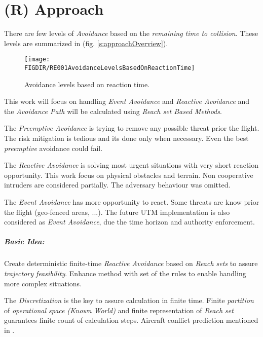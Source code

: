 \chapter{(R) Approach}\label{ch:approach}

\noindent There are few levels of \emph{Avoidance} based on the \emph{remaining time to collision}. These levels are summarized in (fig. \ref{s:approachOverview}).

\begin{figure}[H]
    \centering
    \texttt{[image: \\FIGDIR/RE001AvoidanceLevelsBasedOnReactionTime]} 
    \caption{Avoidance levels based on reaction time.}
    \label{fig:AvoidanceLevels}
\end{figure}

This work will focus on handling \emph{Event Avoidance} and \emph{Reactive Avoidance} and the \emph{Avoidance Path} will be calculated using \emph{Reach set Based Methods}. 

The \emph{Preemptive Avoidance} is trying to remove any possible threat prior the flight. The risk mitigation is tedious and its done only when necessary. Even the best \emph{preemptive} avoidance could fail.

The \emph{Reactive Avoidance} is solving most urgent situations with very short reaction opportunity. This work focus on physical obstacles and terrain. Non cooperative intruders are considered partially. The adversary behaviour was omitted.

The \emph{Event Avoidance} has more opportunity to react. Some threats are know prior the flight (geo-fenced areas, ...). The future UTM implementation is also considered as \emph{Event Avoidance}, due the time horizon and authority enforcement. 

\paragraph{Basic Idea:} Create deterministic finite-time \emph{Reactive Avoidance} based on \emph{Reach sets} to assure \emph{trajectory feasibility}. Enhance method with set of the rules to enable handling more complex situations.

The \emph{Discretization} is the key to assure calculation in finite time. Finite \emph{partition} of \emph{operational space (Known World)} and finite representation of \emph{Reach set} guarantees finite count of calculation steps. Aircraft conflict prediction mentioned in \cite{prandini2008application}.

